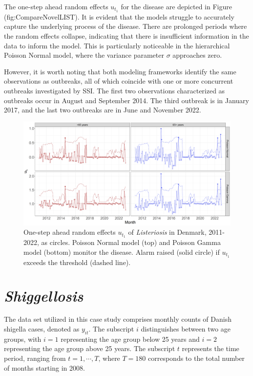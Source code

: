 \documentclass[a4paper,twoside,11pt]{report} %
\theoremstyle{definition}
\theoremstyle{definition}
\theoremstyle{definition}
\theoremstyle{definition}
\theoremstyle{remark}
\begin{document}
The one-step ahead random effects \(u_{t_1}\) for the disease are depicted in Figure \textcite{ref}(fig:CompareNovelLIST). It is evident that the models struggle to accurately capture the underlying process of the disease. There are prolonged periods where the random effects collapse, indicating that there is insufficient information in the data to inform the model. This is particularly noticeable in the hierarchical Poisson Normal model, where the variance parameter \(\sigma\) approaches zero.

However, it is worth noting that both modeling frameworks identify the same observations as outbreaks, all of which coincide with one or more concurrent outbreaks investigated by SSI. The first two observations characterized as outbreaks occur in August and September 2014. The third outbreak is in January 2017, and the last two outbreaks are in June and November 2022.



\begin{figure}[H]
\includegraphics[width=1\linewidth]{../figures/Compare_novel_LIST} \caption{One-step ahead random effects \(u_{t_1}\) of \textit{Listeriosis} in Denmark, 2011-2022, as circles. Poisson Normal model (top) and Poisson Gamma model (bottom) monitor the disease. Alarm raised (solid circle) if \(u_{t_1}\) exceeds the threshold (dashed line).}\label{fig:CompareNovelLIST}
\end{figure}

\section{\textit{Shiggellosis}}

The data set utilized in this case study comprises monthly counts of Danish shigella cases, denoted as \(y_{it}\). The subscript \(i\) distinguishes between two age groups, with \(i = 1\) representing the age group below 25 years and \(i = 2\) representing the age group above 25 years. The subscript \(t\) represents the time period, ranging from \(t = 1,\cdots, T\), where \(T = 180\) corresponds to the total number of months starting in 2008.
\end{document}
